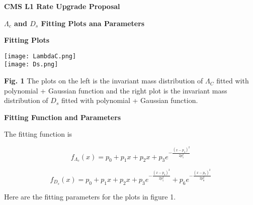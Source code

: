 \documentclass[12pt,oneside,reqno]{amsart}
\begin{document}
\renewcommand{\arraystretch}{1.5}
    \begin{center}{
   \Large \textbf {CMS L1 Rate Upgrade Proposal}
   
   \vspace{0.5cm} \large \textbf{$\Lambda_c$ and $D_s$ Fitting Plots ana Parameters}
   }
   \end{center}
   
   
   \vspace{1cm} \normalsize \textbf{Fitting Plots}
   
   
   
{\centering \texttt{[image: LambdaC.png]} \\}
\endminipage\hfill
{}
{\centering \texttt{[image: Ds.png]} \\}
\endminipage\hfill
 
\footnotesize \textbf{Fig. 1} The plots on the left is the invariant mass distribution of $\Lambda_C$ fitted with polynomial + Gaussian function and the right plot is the invariant mass distribution of $D_s$ fitted with polynomial + Gaussian function. 


\newpage \normalsize \textbf{Fitting Function and Parameters}

The fitting function is

\begin{equation}
f_{\Lambda_c}(x) = p_0 + p_1 x + p_2 x + p_3 e^{-\frac{(x-p_4)^2}{2 p_5^2}}
\end{equation}

\begin{equation}
f_{D_s}(x) = p_0 + p_1 x + p_2 x + p_3 e^{-\frac{(x-p_4)^2}{2 p_5^2}} + p_6 e^{-\frac{(x-p_7)^2}{2 p_8^2}}
\end{equation}

Here are the fitting parameters for the plots in figure 1. 
     
\end{document}
